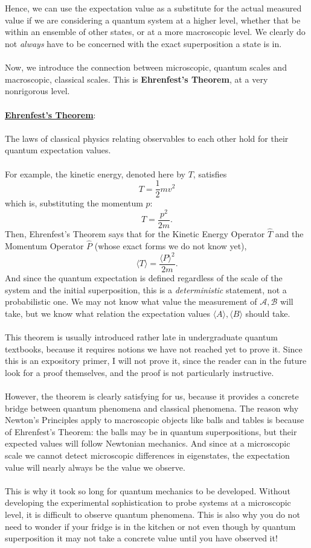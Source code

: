 \\\\
Hence, we can use the expectation value as a substitute for the actual measured value if we are considering a quantum system at a higher level, whether that be within an ensemble of other states, or at a more macroscopic level. We clearly do not \textit{always} have to be concerned with the exact superposition a state is in.
\\\\
Now, we introduce the connection between microscopic, quantum scales and macroscopic, classical scales. This is \textbf{Ehrenfest's Theorem}, at a very nonrigorous level.
\\\\
\underline{\textbf{Ehrenfest's Theorem}}:
\\\\
The laws of classical physics relating observables to each other hold for their quantum expectation values. 
\\\\
For example, the kinetic energy, denoted here by $T$, satisfies
$$
T = \frac{1}{2}mv^{2}
$$
which is, substituting the momentum $p$:
$$
T = \frac{p^2}{2m}.
$$
Then, Ehrenfest's Theorem says that for the Kinetic Energy Operator $\hat{T}$ and the Momentum Operator $\hat{P}$ (whose exact forms we do not know yet),
$$
\langle T \rangle = \frac{\langle P \rangle^{2}}{2m}.
$$
And since the quantum expectation is defined regardless of the scale of the system and the initial superposition, this is a \textit{deterministic} statement, not a probabilistic one. We may not know what value the measurement of $\mathcal{A}, \mathcal{B}$ will take, but we know what relation the expectation values $\langle A \rangle, \langle B \rangle$ should take.
\\\\
This theorem is usually introduced rather late in undergraduate quantum textbooks, because it requires notions we have not reached yet to prove it. Since this is an expository primer, I will not prove it, since the reader can in the future look for a proof themselves, and the proof is not particularly instructive.
\\\\
However, the theorem is clearly satisfying for us, because it provides a concrete bridge between quantum phenomena and classical phenomena. The reason why Newton's Principles apply to macroscopic objects like balls and tables is because of Ehrenfest's Theorem: the balls may be in quantum superpositions, but their expected values will follow Newtonian mechanics. And since at a microscopic scale we cannot detect microscopic differences in eigenstates, the expectation value will nearly always be the value we observe. 
\\\\
This is why it took so long for quantum mechanics to be developed. Without developing the experimental sophistication to probe systems at a microscopic level, it is difficult to observe quantum phenomena. This is also why you do not need to wonder if your fridge is in the kitchen or not even though by quantum superposition it may not take a concrete value until you have observed it!
